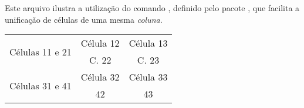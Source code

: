 \documentclass[a4paper,12pt]{article}
\begin{document}
	
	Este arquivo ilustra a utilização do comando , definido pelo pacote , que facilita a unificação de células de uma mesma \emph{coluna}.

	
	\linhabase\hfill
	\begin{tabular}[c]{|c|c|c|}
		\hline
		\multirow{2}{10em}{\centering Células 11 e 21} & Célula 12 & Célula 13 \\
		\cline{2-3}
		                                               & C. 22     & C. 23     \\
		\hline
		\multirow{2}{10em}{\centering Células 31 e 41} & Célula 32 & Célula 33 \\
		\cline{2-3}
		                                               & 42        & 43        \\
		\hline
	\end{tabular}%
	\hfill\null
			
\end{document}
